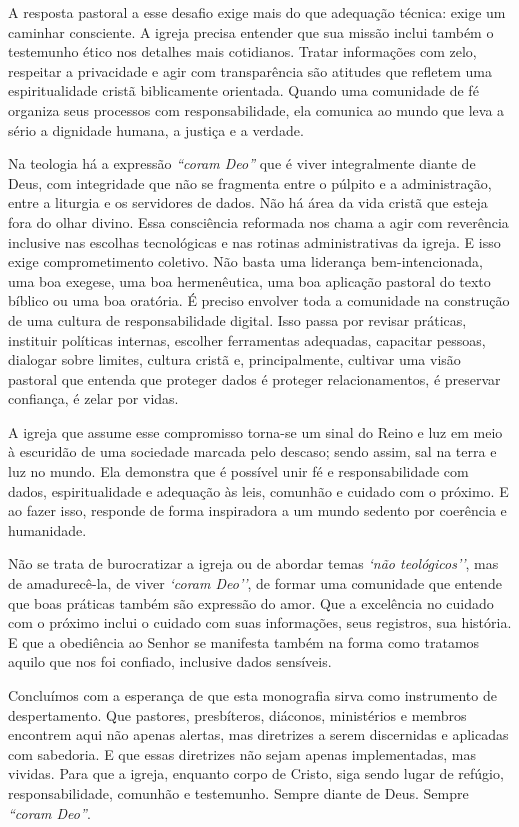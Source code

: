 A resposta pastoral a esse desafio exige mais do que adequação técnica: exige um caminhar consciente. A igreja precisa entender que sua missão inclui também o testemunho ético nos detalhes mais cotidianos. Tratar informações com zelo, respeitar a privacidade e agir com transparência são atitudes que refletem uma espiritualidade cristã biblicamente orientada. Quando uma comunidade de fé organiza seus processos com responsabilidade, ela comunica ao mundo que leva a sério a dignidade humana, a justiça e a verdade.

Na teologia há a expressão \textit{``coram Deo''} que é viver integralmente diante de Deus, com integridade que não se fragmenta entre o púlpito e a administração, entre a liturgia e os servidores de dados. Não há área da vida cristã que esteja fora do olhar divino. Essa consciência reformada nos chama a agir com reverência inclusive nas escolhas tecnológicas e nas rotinas administrativas da igreja. E isso exige comprometimento coletivo. Não basta uma liderança bem-intencionada, uma boa exegese, uma boa hermenêutica, uma boa aplicação pastoral do texto bíblico ou uma boa oratória. É preciso envolver toda a comunidade na construção de uma cultura de responsabilidade digital. Isso passa por revisar práticas, instituir políticas internas, escolher ferramentas adequadas, capacitar pessoas, dialogar sobre limites, cultura cristã e, principalmente, cultivar uma visão pastoral que entenda que proteger dados é proteger relacionamentos, é preservar confiança, é zelar por vidas.

A igreja que assume esse compromisso torna-se um sinal do Reino e luz em meio à escuridão de uma sociedade marcada pelo descaso; sendo assim, sal na terra e luz no mundo. Ela demonstra que é possível unir fé e responsabilidade com dados, espiritualidade e adequação às leis, comunhão e cuidado com o próximo. E ao fazer isso, responde de forma inspiradora a um mundo sedento por coerência e humanidade.

Não se trata de burocratizar a igreja ou de abordar temas \textit{`não teológicos''}, mas de amadurecê-la, de viver \textit{`coram Deo''}, de formar uma comunidade que entende que boas práticas também são expressão do amor. Que a excelência no cuidado com o próximo inclui o cuidado com suas informações, seus registros, sua história. E que a obediência ao Senhor se manifesta também na forma como tratamos aquilo que nos foi confiado, inclusive dados sensíveis.

Concluímos com a esperança de que esta monografia sirva como instrumento de despertamento. Que pastores, presbíteros, diáconos, ministérios e membros encontrem aqui não apenas alertas, mas diretrizes a serem discernidas e aplicadas com sabedoria. E que essas diretrizes não sejam apenas implementadas, mas vividas. Para que a igreja, enquanto corpo de Cristo, siga sendo lugar de refúgio, responsabilidade, comunhão e testemunho. Sempre diante de Deus. Sempre \textit{``coram Deo''}.